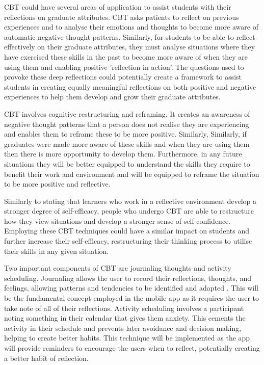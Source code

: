 \documentclass{l4proj}
\begin{document}
CBT could have several areas of application to assist students with their reflections on graduate attributes. CBT asks patients to reflect on previous experiences and to analyse their emotions and thoughts to become more aware of automatic negative thought patterns. Similarly, for students to be able to reflect effectively on their graduate attributes, they must analyse situations where they have exercised these skills in the past to become more aware of when they are using them and enabling positive 'reflection in action'. The questions used to provoke these deep reflections could potentially create a framework to assist students in creating equally meaningful reflections on both positive and negative experiences to help them develop and grow their graduate attributes.

CBT involves cognitive restructuring and reframing. It creates an awareness of negative thought patterns that a person does not realise they are experiencing and enables them to reframe these to be more positive. Similarly, Similarly, if graduates were made more aware of these skills and when they are using them then there is more opportunity to develop them. Furthermore, in any future situations they will be better equipped to understand the skills they require to benefit their work and environment and will be equipped to reframe the situation to be more positive and reflective.

Similarly to \citet{bruno_reflective_2018} stating that learners who work in a reflective environment develop a stronger degree of self-efficacy, people who undergo CBT are able to restructure how they view situations and develop a stronger sense of self-confidence. Employing these CBT techniques could have a similar impact on students and further increase their self-efficacy, restructuring their thinking process to utilise their skills in any given situation. 

Two important components of CBT are journaling thoughts and activity scheduling. Journaling allows the user to record their reflections, thoughts, and feelings, allowing patterns and tendencies to be identified and adapted \citep{ackerman_cbt_2017}. This will be the fundamental concept employed in the mobile app as it requires the user to take note of all of their reflections. Activity scheduling involves a participant noting something in their calendar that gives them anxiety. This cements the activity in their schedule and prevents later avoidance and decision making, helping to create better habits. This technique will be implemented as the app will provide reminders to encourage the users when to reflect, potentially creating a better habit of reflection.
\end{document}
